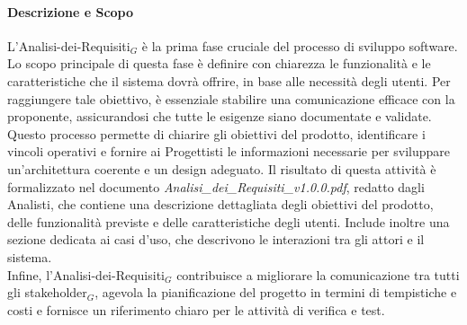 \documentclass[10pt]{article}
\begin{document}
\begin{justify}
        \paragraph{Descrizione e Scopo}
        L'Analisi-dei-Requisiti$_G$ è la prima fase cruciale del processo di sviluppo software. Lo scopo principale di questa fase è definire con chiarezza le funzionalità e le caratteristiche che il sistema dovrà offrire, in base alle necessità degli utenti. Per raggiungere tale obiettivo, è essenziale stabilire una comunicazione efficace con la proponente, assicurandosi che tutte le esigenze siano documentate e validate. Questo processo permette di chiarire gli obiettivi del prodotto, identificare i vincoli operativi e fornire ai Progettisti le informazioni necessarie per sviluppare un'architettura coerente e un design adeguato. Il risultato di questa attività è formalizzato nel documento \textit{Analisi\_dei\_Requisiti\_v1.0.0.pdf}, redatto dagli Analisti, che contiene una descrizione dettagliata degli obiettivi del prodotto, delle funzionalità previste e delle caratteristiche degli utenti. Include inoltre una sezione dedicata ai casi d'uso, che descrivono le interazioni tra gli attori e il sistema.\\
        Infine, l'Analisi-dei-Requisiti$_G$ contribuisce a migliorare la comunicazione tra tutti gli stakeholder$_G$, agevola la pianificazione del progetto in termini di tempistiche e costi e fornisce un riferimento chiaro per le attività di verifica e test.\\


\end{justify}
\end{document}

